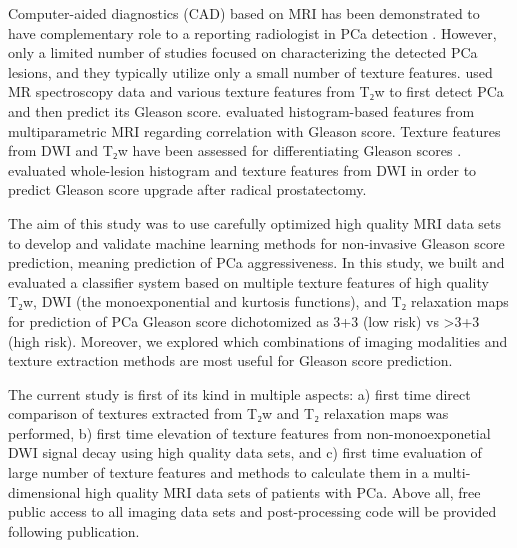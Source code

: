 Computer-aided diagnostics (CAD) based on MRI has been demonstrated to have
complementary role to a reporting radiologist in PCa detection \citep{Kwak2015,
Viswanath2012, Ginsburg2014}. However, only a limited number of studies focused
on characterizing the detected PCa lesions, and they typically utilize only a
small number of texture features. \citet{Tiwari2013} used MR spectroscopy data
and various texture features from T₂w to first detect PCa and then predict its
Gleason score. \citet{Peng2013} evaluated histogram-based features from
multiparametric MRI regarding correlation with Gleason score. Texture features
from DWI and T₂w have been assessed for differentiating Gleason scores
\citep{Wibmer2015, Vignati2015, Fehr2015}. \citet{Rozenberg2016} evaluated
whole-lesion histogram and texture features from DWI in order to predict Gleason
score upgrade after radical prostatectomy.

The aim of this study was to use carefully optimized high quality MRI data sets
to develop and validate machine learning methods for non-invasive Gleason score
prediction, meaning prediction of PCa aggressiveness. In this study, we built
and evaluated a classifier system based on multiple texture features of high
quality T₂w, DWI (the monoexponential and kurtosis functions), and T₂ relaxation
maps for prediction of PCa Gleason score dichotomized as 3+3 (low risk) vs >3+3
(high risk). Moreover, we explored which combinations of imaging modalities and
texture extraction methods are most useful for Gleason score prediction.

The current study is first of its kind in multiple aspects: a) first time direct
comparison of textures extracted from T₂w and T₂ relaxation maps was performed,
b) first time elevation of texture features from non-monoexponetial DWI signal
decay using high quality data sets, and c) first time evaluation of large number
of texture features and methods to calculate them in a multi-dimensional high
quality MRI data sets of patients with PCa. Above all, free public access to all
imaging data sets and post-processing code will be provided following
publication.
